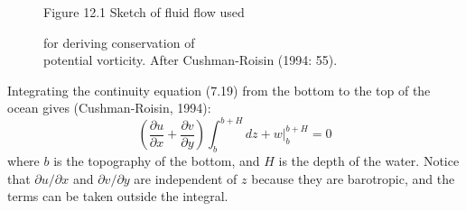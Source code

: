 \begin{figure}[t!]
\centering
{}
\footnotesize
Figure 12.1 Sketch of fluid flow used \rule{0mm}{3ex}for deriving
conservation of\\potential vorticity. After Cushman-Roisin (1994: 55).

\label{fig:vorticitysketch}
\vspace{-3ex}
\end{figure}

Integrating the continuity equation (7.19) from the bottom to the top
of the ocean gives (Cushman-Roisin, 1994):
\begin{equation}
\left( \frac{\partial{u}}{\partial{x}} + \frac{\partial{v}}{\partial{y}}\right) \int_{b}^{b+H} dz + w \bigr|_{b}^{b+H} = 0
\end{equation}
where $b$ is the topography of the bottom, and $H$ is the depth of the
water. Notice that $\partial{u}/\partial{x}$ and
$\partial{v}/\partial{y}$ are independent of $z$ because they are
barotropic, and the terms can be taken outside the integral.

